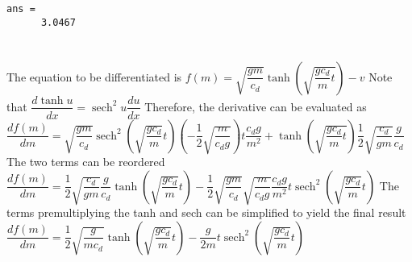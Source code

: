 \documentclass[../main.tex]{subfiles}
\begin{document}
\begin{enumerate}[label=\bfseries(\alph*)]
\begin{lstlisting}[numbers=none]
ans =
 	  3.0467

\end{lstlisting}
\bigbreak

\section{}
The equation to be differentiated is
\bigbreak
$f(m)=\sqrt{\dfrac{g m}{c_{d}}} \tanh \left(\sqrt{\dfrac{g c_{d}}{m} t}\right )-v$
\bigbreak
Note that
\bigbreak
$\dfrac{d \tanh u}{d x}=\operatorname{sech}^{2} u \dfrac{d u}{d x}$
\bigbreak
Therefore, the derivative can be evaluated as
\bigbreak
$\dfrac{d f(m)}{d m}=\sqrt{\dfrac{g m}{c_{d}}} \operatorname{sech}^{2}\left(\sqrt{\dfrac{g c_{d}}{m}} t\right)\left(-\dfrac{1}{2} \sqrt{\dfrac{m}{c_{d} g}}\right) t \dfrac{c_{d} g}{m^{2}}+\tanh \left(\sqrt{\dfrac{g c_{d}}{m} t}\right) \dfrac{1}{2} \sqrt{\dfrac{c_{d}}{g m}} \dfrac{g}{c_{d}}$
\bigbreak
The two terms can be reordered
\bigbreak
$\dfrac{d f(m)}{d m}=\dfrac{1}{2} \sqrt{\dfrac{c_{d}}{g m}} \dfrac{g}{c_{d}} \tanh \left(\sqrt{\dfrac{g c_{d}}{m}} t\right)-\dfrac{1}{2} \sqrt{\dfrac{g m}{c_{d}}} \sqrt{\dfrac{m}{c_{d} g}} \dfrac{c_{d} g}{m^{2}} t \operatorname{sech}^{2}\left(\sqrt{\dfrac{g c_{d}}{m}} t\right)$
\bigbreak
The terms premultiplying the tanh and sech can be simplified to yield the final result
\bigbreak
$\dfrac{d f(m)}{d m}=\dfrac{1}{2} \sqrt{\dfrac{g}{m c_{d}}} \tanh \left(\sqrt{\dfrac{g c_{d}}{m}} t\right)-\dfrac{g}{2 m} t \operatorname{sech}^{2}\left(\sqrt{\dfrac{g c_{d}}{m}} t\right)$
\bigbreak
\end{enumerate}
\end{document}
